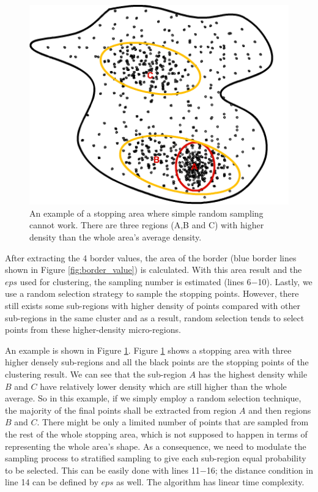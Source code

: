 \documentclass[12pt,glossary]{dalcsthesis}
\begin{document}
\begin{figure}[!htb]
\centering
\includegraphics[width=4.5in]{stopExample.png}
\caption{An example of a stopping area where simple random sampling cannot work. There are three regions (A,B and C) with higher density than the whole area's average density.}
\label{fig:stopping_area}
\end{figure}

After extracting the 4 border values, the area of the border (blue border lines shown in Figure \ref{fig:border_value}) is calculated. With this area result and the $eps$ used for clustering, the sampling number is estimated (lines 6$-$10). Lastly, we use a random selection strategy to sample the stopping points. However, there still exists some sub-regions with higher density of points compared with other sub-regions in the same cluster and as a result,  random selection tends to select points from these higher-density micro-regions. 

An example is shown in Figure \ref{fig:stopping_area}. Figure \ref{fig:stopping_area} shows a stopping area with three higher densely sub-regions and all the black points are the stopping points of the clustering result. We can see that the sub-region $A$ has the highest density while $B$ and $C$ have relatively lower density which are still higher than the whole average. So in this example, if we simply employ a random selection technique, the majority of the final points shall be extracted from region $A$ and then regions $B$ and $C$. There might be only a limited number of points that are sampled from the rest of the whole stopping area, which is not supposed to happen in terms of representing the whole area's shape.  As a consequence, we need to modulate the  sampling process to stratified sampling to give each sub-region equal probability to be selected. This can be easily done with lines 11$-$16; the distance condition in line 14 can be defined by $eps$ as well. The algorithm has linear time complexity.
\end{document}
